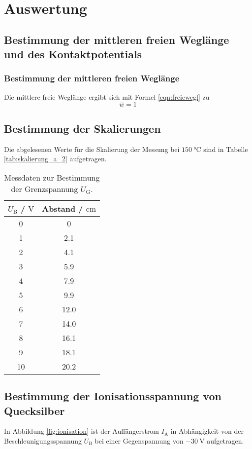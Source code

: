 \section{Auswertung}
\label{sec:Auswertung}
\FloatBarrier
\subsection{Bestimmung der mittleren freien Weglänge und des Kontaktpotentials}
\subsubsection{Bestimmung der mittleren freien Weglänge}
Die mittlere freie Weglänge ergibt sich mit Formel \eqref{eqn:freiewegl} zu
\begin{equation*}
	\bar{w} = 1
\end{equation*}

\FloatBarrier
\subsection{Bestimmung der Skalierungen}
Die abgelesenen Werte für die Skalierung der Messung bei $\SI{150}{\celsius}$ sind in 
Tabelle \ref{tab:skalierung_a_2} aufgetragen.
\begin{table}
	\centering
	\caption{Messdaten zur Bestimmung der Grenzspannung $U_\mathrm{G}$.}
	\label{tab:ug}
	\begin{tabular}{cc}
		\toprule
		$U_{\mathrm{B}}$ / $\si{\volt}$ & Abstand / $\si{\centi\meter}$ \\
		\midrule
		0 & 0 \\
		1 & 2.1 \\
		2 & 4.1 \\
		3 & 5.9 \\
		4 & 7.9 \\
		5 & 9.9 \\
		6 & 12.0 \\
		7 & 14.0 \\
		8 & 16.1 \\
		9 & 18.1 \\
		10 & 20.2 \\
		\bottomrule
	\end{tabular}
\end{table}









\FloatBarrier
\subsection{Bestimmung der Ionisationsspannung von Quecksilber}
In Abbildung \ref{fig:ionisation} ist der Auffängerstrom $I_{\mathrm{A}}$ in Abhängigkeit 
von der Beschleunigungsspannung $U_{\mathrm{B}}$ bei einer Gegenspannung von $-\SI{30}{\volt}$ 
aufgetragen. 

